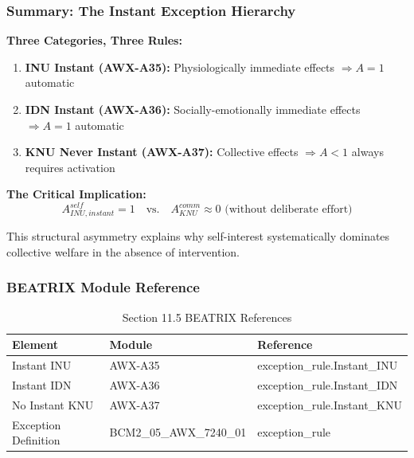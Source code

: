 \subsubsection{Summary: The Instant Exception Hierarchy}

\begin{tcolorbox}[colback=blue!5!white, colframe=blue!75!black, title=The Instant Exception Rule]

\textbf{Three Categories, Three Rules:}

\begin{enumerate}
\item \textbf{INU Instant (AWX-A35):} Physiologically immediate effects 
$\Rightarrow A = 1$ automatic
\item \textbf{IDN Instant (AWX-A36):} Socially-emotionally immediate effects 
$\Rightarrow A = 1$ automatic
\item \textbf{KNU Never Instant (AWX-A37):} Collective effects 
$\Rightarrow A < 1$ always requires activation
\end{enumerate}

\textbf{The Critical Implication:}
$$A^{self}_{INU,instant} = 1 \quad \text{vs.} \quad A^{comm}_{KNU} \approx 0 \text{ (without deliberate effort)}$$

This structural asymmetry explains why self-interest systematically 
dominates collective welfare in the absence of intervention.

\end{tcolorbox}

\subsubsection{BEATRIX Module Reference}

\begin{table}[htbp]
\centering
\caption{Section 11.5 BEATRIX References}
\label{tab:11-5-beatrix}
\renewcommand{\arraystretch}{1.3}
\begin{tabular}{@{}lll@{}}
\toprule
\textbf{Element} & \textbf{Module} & \textbf{Reference} \\
\midrule
Instant INU & AWX-A35 & exception\_rule.Instant\_INU \\
Instant IDN & AWX-A36 & exception\_rule.Instant\_IDN \\
No Instant KNU & AWX-A37 & exception\_rule.Instant\_KNU \\
Exception Definition & BCM2\_05\_AWX\_7240\_01 & exception\_rule \\
\bottomrule
\end{tabular}
\end{table}

